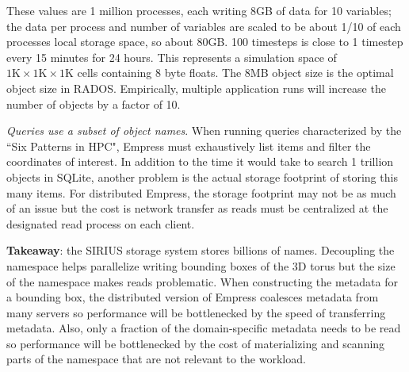 These values are 1 million processes, each writing 8GB of data for 10
variables; the data per process and number of variables are scaled to be about
1/10 of each processes local storage space, so about 80GB. 100 timesteps is
close to 1 timestep every 15 minutes for 24 hours. This represents a simulation
space of \(1\text{K}\times1\text{K}\times1\text{K}\) cells containing 8 byte
floats.  The 8MB object size is the optimal object size in RADOS.  Empirically,
multiple application runs will increase the number of objects by a factor of
10.

\emph{Queries use a subset of object names}. When running queries characterized
by the ``Six Patterns in HPC", Empress must exhaustively list items and
filter the coordinates of interest.  In addition to the time it would take to
search 1 trillion objects in SQLite, another problem is the actual storage
footprint of storing this many items. For distributed Empress, the storage
footprint may not be as much of an issue but the cost is network transfer as
reads must be centralized at the designated read process on each client.

\textbf{Takeaway}: the SIRIUS storage system stores billions of names.
Decoupling the namespace helps parallelize writing bounding boxes of the 3D
torus but the size of the namespace makes reads problematic. When constructing
the metadata for a bounding box, the distributed version of Empress coalesces
metadata from many servers so performance
will be bottlenecked by the speed of transferring metadata. Also, only a
fraction of the domain-specific metadata needs to be read so performance will
be bottlenecked by the cost of materializing and scanning parts of the
namespace that are not relevant to the workload.
